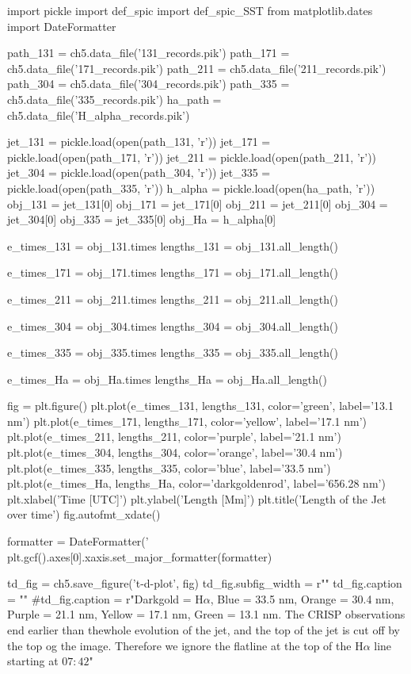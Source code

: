 \begin{pycode}[chapter5]
import pickle
import def_spic
import def_spic_SST
from matplotlib.dates import DateFormatter

path_131 = ch5.data_file('131_records.pik')
path_171 = ch5.data_file('171_records.pik')
path_211 = ch5.data_file('211_records.pik')
path_304 = ch5.data_file('304_records.pik')
path_335 = ch5.data_file('335_records.pik')
ha_path = ch5.data_file('H_alpha_records.pik')

jet_131 = pickle.load(open(path_131, 'r'))
jet_171 = pickle.load(open(path_171, 'r'))
jet_211 = pickle.load(open(path_211, 'r'))
jet_304 = pickle.load(open(path_304, 'r'))
jet_335 = pickle.load(open(path_335, 'r'))
h_alpha = pickle.load(open(ha_path, 'r'))
obj_131 = jet_131[0]
obj_171 = jet_171[0]
obj_211 = jet_211[0]
obj_304 = jet_304[0]
obj_335 = jet_335[0]
obj_Ha = h_alpha[0]

e_times_131 = obj_131.times
lengths_131 = obj_131.all_length()

e_times_171 = obj_171.times
lengths_171 = obj_171.all_length()

e_times_211 = obj_211.times
lengths_211 = obj_211.all_length()

e_times_304 = obj_304.times
lengths_304 = obj_304.all_length()

e_times_335 = obj_335.times
lengths_335 = obj_335.all_length()

e_times_Ha = obj_Ha.times
lengths_Ha = obj_Ha.all_length()

fig = plt.figure()
plt.plot(e_times_131, lengths_131, color='green', label='13.1 nm')
plt.plot(e_times_171, lengths_171, color='yellow', label='17.1 nm')
plt.plot(e_times_211, lengths_211, color='purple', label='21.1 nm')
plt.plot(e_times_304, lengths_304, color='orange', label='30.4 nm')
plt.plot(e_times_335, lengths_335, color='blue', label='33.5 nm')
plt.plot(e_times_Ha, lengths_Ha, color='darkgoldenrod', label='656.28 nm')
plt.xlabel('Time [UTC]')
plt.ylabel('Length [Mm]')
plt.title('Length of the Jet over time')
fig.autofmt_xdate()

formatter = DateFormatter('%
plt.gcf().axes[0].xaxis.set_major_formatter(formatter)

td_fig = ch5.save_figure('t-d-plot', fig)
td_fig.subfig_width = r"\columnwidth"
td_fig.caption = ""
#td_fig.caption = r"Darkgold = H$\alpha$, Blue = 33.5 nm, Orange = 30.4 nm, Purple = 21.1 nm, Yellow = 17.1 nm, Green = 13.1 nm. The CRISP observations end earlier than thewhole evolution of the jet, and the top of the jet is cut off by the top og the image. Therefore we ignore the flatline at the top of the H$\alpha$ line starting at $07:42$"
\end{pycode}

